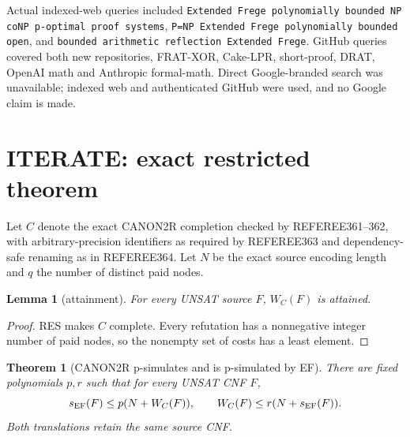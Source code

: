 \documentclass[11pt]{article}
\newtheorem{theorem}{Theorem}
\newtheorem{lemma}{Lemma}
\begin{document}
Actual indexed-web queries included
\texttt{Extended Frege polynomially bounded NP coNP p-optimal proof systems},
\texttt{P=NP Extended Frege polynomially bounded open}, and
\texttt{bounded arithmetic reflection Extended Frege}.  GitHub queries covered
both new repositories, FRAT-XOR, Cake-LPR, short-proof, DRAT, OpenAI math and
Anthropic formal-math.  Direct Google-branded search was unavailable; indexed
web and authenticated GitHub were used, and no Google claim is made.

\section{ITERATE: exact restricted theorem}

Let $C$ denote the exact CANON2R completion checked by REFEREE361--362, with
arbitrary-precision identifiers as required by REFEREE363 and dependency-safe
renaming as in REFEREE364.  Let $N$ be the exact source encoding length and
$q$ the number of distinct paid nodes.

\begin{lemma}[attainment]
For every UNSAT source $F$, $W_C(F)$ is attained.
\end{lemma}
\begin{proof}
RES makes $C$ complete.  Every refutation has a nonnegative integer number of
paid nodes, so the nonempty set of costs has a least element.
\end{proof}

\begin{theorem}[CANON2R p-simulates and is p-simulated by EF]
There are fixed polynomials $p,r$ such that for every UNSAT CNF $F$,
\[
 s_{\rm EF}(F)\le p(N+W_C(F)),\qquad
 W_C(F)\le r(N+s_{\rm EF}(F)).
\]
Both translations retain the same source CNF.
\end{theorem}
\end{document}
